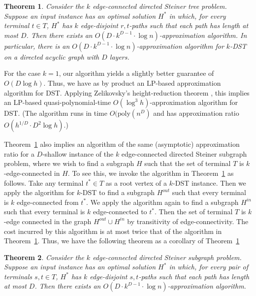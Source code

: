 \documentclass[11pt]{article}
\newtheorem{theorem}{Theorem}
\theoremstyle{definition}
\theoremstyle{remark}
\newcommand{\poly}{\mathrm{poly}}
\begin{document}
\begin{theorem}
\label{thm:approx-k-dst}
Consider the $k$ edge-connected directed Steiner tree problem.
Suppose an input instance has an optimal solution $H^*$ in which,
for every terminal $t\in T$, 
$H^*$ has $k$ edge-disjoint $r,t$-paths 
such that each path has length at most $D$. 
Then there exists an $O(D\cdot k^{D-1}\cdot \log n)$-approximation
algorithm.
In particular, there is an 
$O(D\cdot k^{D-1}\cdot \log n)$-approximation
algorithm for $k$-DST on a directed acyclic graph with $D$ layers.
\end{theorem}

For the case $k=1$, our algorithm yields a slightly better guarantee
of $O(D\log h)$. 
Thus, we have as by product an LP-based approximation algorithm 
for DST.
Applying Zelikovsky's height-reduction theorem
\cite{Zelikovsky97,HelvigRZ01},
this implies an LP-based quasi-polynomial-time
$O(\log^3 h)$-approximation algorithm for DST.
(The algorithm runs in time $O(\poly(n^D)$ and has approximation ratio
$O(h^{1/D}\cdot D^2 \log h)$.)

Theorem~\ref{thm:approx-k-dst} also implies an algorithm of the same 
(asymptotic) approximation ratio for a $D$-shallow instance of 
the $k$ edge-connected directed Steiner subgraph problem, where we
wish to find a subgraph $H$ such that the set of terminal $T$ is
$k$-edge-connected in $H$. 
To see this, we invoke the algorithm in
Theorem~\ref{thm:approx-k-dst} as follows.
Take any terminal $t^*\in T$ as a root vertex of a $k$-DST instance.
Then we apply the algorithm for $k$-DST to find a subgraph $H^{out}$
such that every terminal is $k$ edge-connected from $t^*$.
We apply the algorithm again to find a subgraph $H^{in}$ 
such that every terminal is $k$ edge-connected to $t^*$.
Then the set of terminal $T$ is $k$-edge connected in the graph
$H^{out}\cup H^{in}$ by transitivity of edge-connectivity.
The cost incurred by this algorithm is at most twice that of 
the algorithm in Theorem~\ref{thm:approx-k-dst}.
Thus, we have the following theorem as a corollary of 
Theorem~\ref{thm:approx-k-dst}

\begin{theorem}
\label{thm:approx-k-conn-subgraph}
\label{thm:approx-k-dst}
Consider the $k$ edge-connected directed Steiner subgraph problem.
Suppose an input instance has an optimal solution $H^*$ in which,
for every pair of terminals $s,t\in T$, 
$H^*$ has $k$ edge-disjoint $s,t$-paths 
such that each path has length at most $D$. 
Then there exists an $O(D\cdot k^{D-1}\cdot \log n)$-approximation
algorithm.
\end{theorem}
\end{document}
